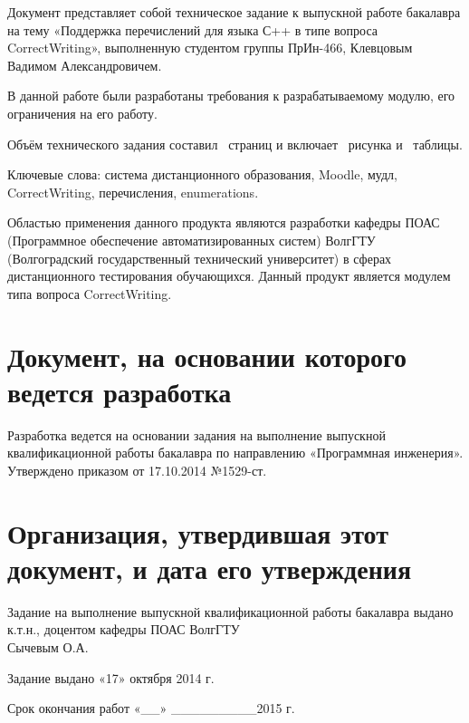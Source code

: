 \documentclass[a4paper,english]{G2-105}
\begin{document}
\VSTUMakeCenteredTOC
{}
\par Документ представляет собой техническое задание к выпускной работе бакалавра на тему «Поддержка перечислений для языка С++ в типе вопроса CorrectWriting», выполненную студентом группы ПрИн-466, Клевцовым Вадимом Александровичем.
\par В данной работе были разработаны требования к разрабатываемому модулю, его ограничения на его работу.
\par Объём технического задания составил \totalpages~страниц и включает \totalfigures~рисунка и \totaltables~таблицы. 
\par Ключевые слова: система дистанционного образования, Moodle, мудл, CorrectWriting, перечисления, enumerations.
\VSTUInitializeTZ
\tableofcontents
\newpage


\par Областью применения данного продукта являются разработки кафедры ПОАС (Программное
обеспечение автоматизированных систем) ВолгГТУ (Волгоградский государственный
технический университет) в сферах дистанционного тестирования обучающихся. 
Данный продукт является модулем типа вопроса CorrectWriting. 

\ttl
\section{Документ, на основании которого ведется разработка}
\par Разработка ведется на основании задания на выполнение выпускной квалификационной работы бакалавра по направлению «Программная инженерия». Утверждено приказом от 17.10.2014 №1529-ст.
\section{Организация, утвердившая этот документ, и дата его утверждения}
\par Задание на выполнение выпускной квалификационной работы бакалавра выдано к.т.н., доцентом кафедры ПОАС ВолгГТУ \\ Сычевым О.А. 
\par Задание выдано «17» октября 2014 г.
\par Срок окончания работ «\_\_» \_\_\_\_\_\_\_\_\_2015 г.
\end{document}
